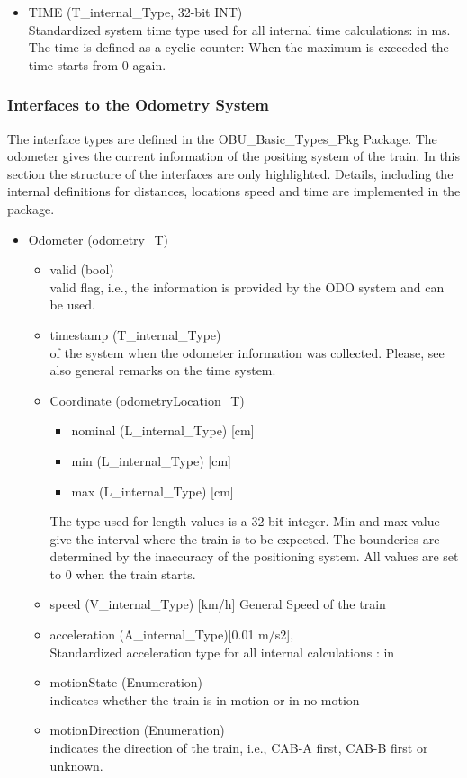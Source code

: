 \documentclass{template/openetcs_report}
\begin{document}
\begin{itemize}
\item TIME (T\_internal\_Type, 32-bit INT)\\
Standardized system time type used for all internal time calculations: in ms. The time is defined as a cyclic counter: When the maximum is exceeded the time starts from 0 again. 
\end{itemize}

\subsubsection{Interfaces to the Odometry System}
The interface types are defined in the OBU\_Basic\_Types\_Pkg Package. 
The odometer gives the current information of the positing system of the train. In this section the structure of the interfaces are only highlighted. Details, including the internal definitions for distances, locations speed and time are implemented in the package. 

\begin{itemize}
\item Odometer (odometry\_T)
\begin{itemize}
\item valid (bool)\\
valid flag, i.e., the information is provided by the ODO system and can be used.
\item timestamp (T\_internal\_Type)\\
of the system when the odometer information was collected. Please, see also general remarks on the time system. 
\item Coordinate (odometryLocation\_T)
\begin{itemize}
\item nominal (L\_internal\_Type) [cm]
\item min (L\_internal\_Type) [cm]
\item max (L\_internal\_Type) [cm]
\end{itemize}
The type used for length values is a 32 bit integer. 
Min and max value give the interval where the train is to be expected. The bounderies are determined by the inaccuracy of the positioning system. All values are set to 0 when the train starts.
\item speed (V\_internal\_Type) [km/h]
General Speed of the train
\item acceleration (A\_internal\_Type)[0.01 m/s2],\\
Standardized acceleration type for all internal calculations : in 
\item motionState (Enumeration)\\
indicates whether the train is in motion or in no motion
\item motionDirection (Enumeration)\\
indicates the direction of the train, i.e., CAB-A first, CAB-B first or unknown.
\end{itemize}
\end{itemize}
\end{document}
